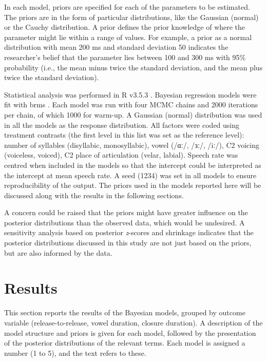 \documentclass[12pt,a4paper,]{article}
\begin{document}
In each model, priors are specified for each of the parameters to be
estimated. The priors are in the form of particular distributions, like
the Gaussian (normal) or the Cauchy distribution. A prior defines the
prior knowledge of where the parameter might lie within a range of
values. For example, a prior as a normal distribution with mean 200 ms
and standard deviation 50 indicates the researcher's belief that the
parameter lies between 100 and 300 ms with 95\% probability (i.e., the
mean minus twice the standard deviation, and the mean plus twice the
standard deviation).

Statistical analysis was performed in R v3.5.3 \citep{r-core-team2019}.
Bayesian regression models were fit with brms
\citep{burkner2017, burkner2018}. Each model was run with four MCMC
chains and 2000 iterations per chain, of which 1000 for warm-up. A
Gaussian (normal) distribution was used in all the models as the
response distribution. All factors were coded using treatment contrasts
(the first level in this list was set as the reference level): number of
syllables (disyllabic, monosyllabic), vowel (/ɑː/, /ɜː/, /iː/), C2
voicing (voiceless, voiced), C2 place of articulation (velar, labial).
Speech rate was centred when included in the models so that the
intercept could be interpreted as the intercept at mean speech rate. A
seed (1234) was set in all models to ensure reproducibility of the
output. The priors used in the models reported here will be discussed
along with the results in the following sections.

A concern could be raised that the priors might have greater influence
on the posterior distributions than the observed data, which would be
undesired. A sensitivity analysis based on posterior \emph{z}-scores and
shrinkage \citep{betancourt2018} indicates that the posterior
distributions discussed in this study are not just based on the priors,
but are also informed by the data.

\hypertarget{results}{%
\section{Results}\label{results}}

This section reports the results of the Bayesian models, grouped by
outcome variable (release-to-release, vowel duration, closure duration).
A description of the model structure and priors is given for each model,
followed by the presentation of the posterior distributions of the
relevant terms. Each model is assigned a number (1 to 5), and the text
refers to these.
\end{document}
